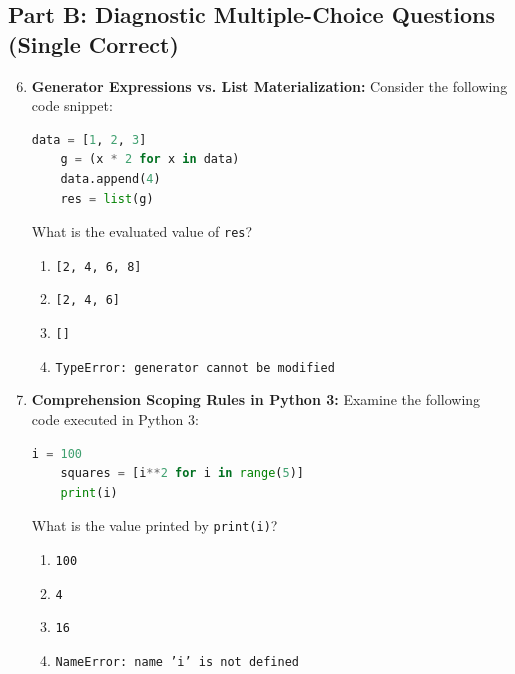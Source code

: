 \subsection*{Part B: Diagnostic Multiple-Choice Questions (Single Correct)}

\begin{enumerate}
    \setcounter{enumi}{5}
    \item \textbf{Generator Expressions vs. List Materialization:}
    Consider the following code snippet:
    \begin{lstlisting}[language=Python]
    data = [1, 2, 3]
    g = (x * 2 for x in data)
    data.append(4)
    res = list(g)
    \end{lstlisting}
    What is the evaluated value of \texttt{res}?
    \begin{enumerate}
        \item \texttt{[2, 4, 6, 8]}
        \item \texttt{[2, 4, 6]}
        \item \texttt{[]}
        \item \texttt{TypeError: generator cannot be modified}
    \end{enumerate}

    \item \textbf{Comprehension Scoping Rules in Python 3:}
    Examine the following code executed in Python 3:
    \begin{lstlisting}[language=Python]
    i = 100
    squares = [i**2 for i in range(5)]
    print(i)
    \end{lstlisting}
    What is the value printed by \texttt{print(i)}?
    \begin{enumerate}
        \item \texttt{100}
        \item \texttt{4}
        \item \texttt{16}
        \item \texttt{NameError: name 'i' is not defined}
    \end{enumerate}
\end{enumerate}
